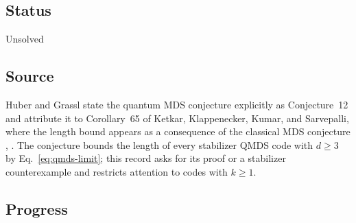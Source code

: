 \subsection*{Status}

Unsolved

\subsection*{Source}

Huber and Grassl state the quantum MDS conjecture explicitly as
Conjecture~12 and attribute it to Corollary~65 of Ketkar, Klappenecker,
Kumar, and Sarvepalli, where the length bound appears as a consequence of
the classical MDS conjecture ,
.  The conjecture bounds the length of
every stabilizer QMDS code with $d\geq3$ by Eq.~\eqref{eq:qmds-limit}; this
record asks for its proof or a stabilizer counterexample and restricts
attention to codes with $k\geq1$.

\subsection*{Progress}

